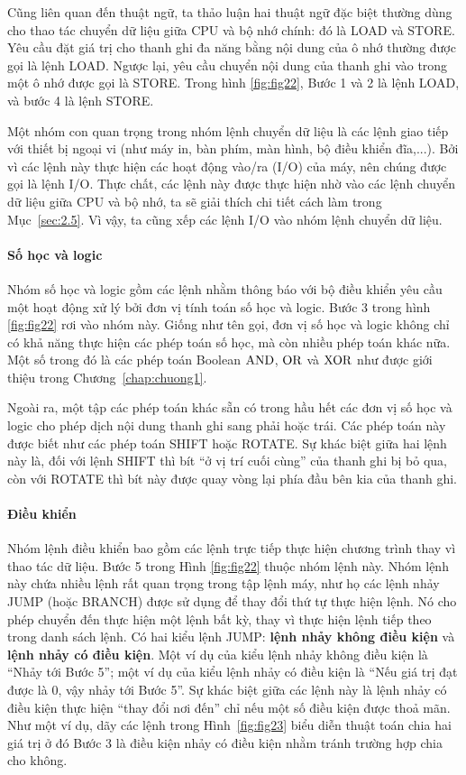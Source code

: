 Cũng liên quan đến thuật ngữ, ta thảo luận hai thuật ngữ đặc biệt thường dùng cho thao tác
chuyển dữ liệu giữa CPU và bộ nhớ chính: đó là LOAD và STORE. Yêu cầu đặt giá trị cho
thanh ghi đa năng bằng nội dung của ô nhớ thường được gọi là lệnh LOAD.  Ngược lại, yêu
cầu chuyển nội dung của thanh ghi vào trong một ô nhớ được gọi là STORE. Trong hình
\ref{fig:fig22}, Bước 1 và 2 là lệnh LOAD, và bước 4 là lệnh STORE.

Một nhóm con quan trọng trong nhóm lệnh chuyển dữ liệu là các lệnh giao tiếp với thiết bị
ngoại vi (như máy in, bàn phím, màn hình, bộ điều khiển đĩa,...). Bởi vì các lệnh này thực
hiện các hoạt động vào/ra (I/O) của máy, nên chúng được gọi là lệnh I/O. Thực chất, các
lệnh này được thực hiện nhờ vào các lệnh chuyển dữ liệu giữa CPU và bộ nhớ, ta sẽ giải
thích chi tiết cách làm trong Mục~\ref{sec:2.5}. Vì vậy, ta cũng xếp các lệnh I/O vào nhóm
lệnh chuyển dữ liệu.

\paragraph{Số học và logic} Nhóm số học và logic gồm các lệnh nhằm thông báo với bộ điều
khiển yêu cầu một hoạt động xử lý bởi đơn vị tính toán số học và logic. Bước 3 trong hình
\ref{fig:fig22} rơi vào nhóm này. Giống như tên gọi, đơn vị số học và logic không chỉ có khả
năng thực hiện các phép toán số học, mà còn nhiều phép toán khác nữa.  Một số trong đó là
các phép toán Boolean $\operatorname{\mbox{AND}}$, $\operatorname{\mbox{OR}}$ và $\operatorname{\mbox{XOR}}$ như được giới thiệu trong Chương~\ref{chap:chuong1}.

Ngoài ra, một tập các phép toán khác sẵn có trong hầu hết các đơn vị số học và logic cho
phép dịch nội dung thanh ghi sang phải hoặc trái. Các phép toán này được biết như các phép
toán SHIFT hoặc ROTATE. Sự khác biệt giữa hai lệnh này là, đối với lệnh SHIFT thì bít ``ở
vị trí cuối cùng'' của thanh ghi bị bỏ qua, còn với ROTATE thì bít này được quay vòng lại
phía đầu bên kia của thanh ghi.

\paragraph{Điều khiển} Nhóm lệnh điều khiển bao gồm các lệnh trực tiếp thực hiện chương
trình thay vì thao tác dữ liệu. Bước 5 trong Hình \ref{fig:fig22} thuộc nhóm lệnh
này. Nhóm lệnh này chứa nhiều lệnh rất quan trọng trong tập lệnh máy, như họ các lệnh nhảy
JUMP (hoặc BRANCH) được sử dụng để thay đổi thứ tự thực hiện lệnh. Nó cho phép chuyển đến
thực hiện một lệnh bất kỳ, thay vì thực hiện lệnh tiếp theo trong danh sách lệnh. Có hai
kiểu lệnh JUMP: \textbf{lệnh nhảy không điều kiện} và \textbf{lệnh nhảy có điều kiện}. Một
ví dụ của kiểu lệnh nhảy không điều kiện là ``Nhảy tới Bước 5''; một ví dụ của kiểu lệnh
nhảy có điều kiện là ``Nếu giá trị đạt được là 0, vậy nhảy tới Bước 5''. Sự khác biệt giữa
các lệnh này là lệnh nhảy có điều kiện thực hiện ``thay đổi nơi đến'' chỉ nếu một số điều
kiện được thoả mãn. Như một ví dụ, dãy các lệnh trong Hình~\ref{fig:fig23} biểu diễn thuật
toán chia hai giá trị ở đó Bước 3 là điều kiện nhảy có điều kiện nhằm tránh trường hợp
chia cho không.

